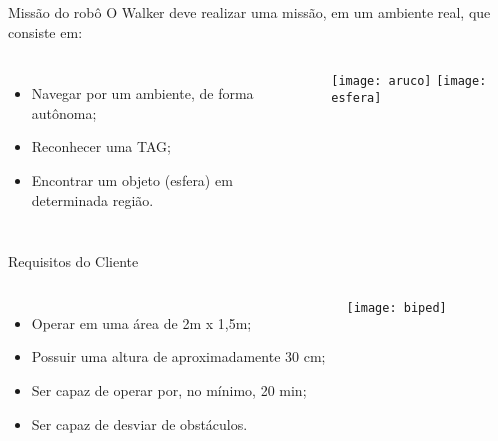 \begin{frame}[t]{Missão do robô} 
    O Walker deve realizar uma missão, em um ambiente real, que consiste em:
    \newline
    \begin{columns}[c]
            \begin{itemize}
                \item Navegar por um ambiente, de 
                forma autônoma;
                \item Reconhecer uma TAG;
                \item Encontrar um objeto (esfera) 
                em determinada região.
            \end{itemize}
                \hspace{2cm}\texttt{[image: aruco]}
                \newline
                \texttt{[image: esfera]}
    \end{columns}
        
\end{frame}


\begin{frame}[t]{Requisitos do Cliente} 
    \begin{columns}[c]
            \begin{itemize}
                \item Operar em uma área de 2m x 1,5m;
                \item Possuir uma altura de aproximadamente 30 cm;
                \item Ser capaz de operar por, no mínimo, 20 min;
                \item Ser capaz de desviar de obstáculos.
            \end{itemize}
            \texttt{[image: biped]}
    \end{columns}

\end{frame}


